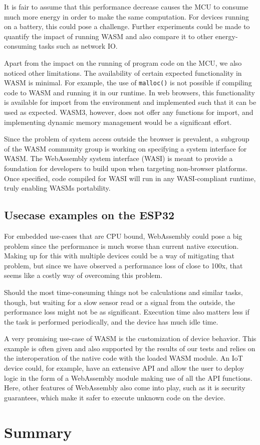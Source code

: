 It is fair to assume that this performance decrease causes the MCU to consume much more energy in order to make the same computation. For devices running on a battery, this could pose a challenge. Further experiments could be made to quantify the impact of running WASM and also compare it to other energy-consuming tasks such as network IO.

Apart from the impact on the running of program code on the MCU, we also noticed other limitations. The availability of certain expected functionality in WASM is minimal. For example, the use of \lstinline{malloc()} is not possible if compiling code to WASM and running it in our runtime. In web browsers, this functionality is available for import from the environment and implemented such that it can be used as expected. WASM3, however, does not offer any functions for import, and implementing dynamic memory management would be a significant effort.

Since the problem of system access outside the browser is prevalent, a subgroup of the WASM community group is working on specifying a system interface for WASM\autocite{clark_standardizing_2019}. The WebAssembly system interface (WASI) is meant to provide a foundation for developers to build upon when targeting non-browser platforms. Once specified, code compiled for WASI will run in any WASI-compliant runtime, truly enabling WASMs portability.

\subsection{Usecase examples on the ESP32}

For embedded use-cases that are CPU bound, WebAssembly could pose a big problem since the performance is much worse than current native execution. Making up for this with multiple devices could be a way of mitigating that problem, but since we have observed a performance loss of close to 100x, that seems like a costly way of overcoming this problem.

Should the most time-consuming things not be calculations and similar tasks, though, but waiting for a slow sensor read or a signal from the outside, the performance loss might not be as significant. Execution time also matters less if the task is performed periodically, and the device has much idle time.

A very promising use-case of WASM is the customization of device behavior. This example is often given and also supported by the results of our tests and relies on the interoperation of the native code with the loaded WASM module. An IoT device could, for example, have an extensive API and allow the user to deploy logic in the form of a WebAssembly module making use of all the API functions. Here, other features of WebAssembly also come into play, such as it is security guarantees, which make it safer to execute unknown code on the device.

\section{Summary}